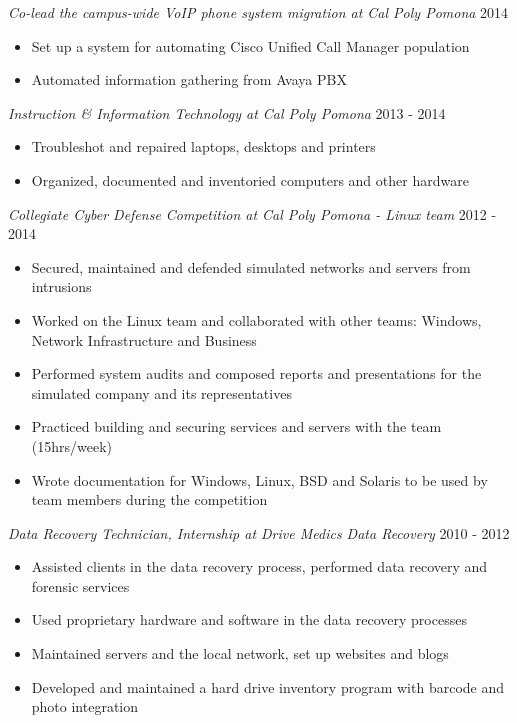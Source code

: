 \documentclass[line]{tex/res}
\begin{document}
\begin{resume}
    {\sl Co-lead the campus-wide VoIP phone system migration at Cal Poly Pomona} \hfill 2014
    \begin{itemize} \itemsep -2pt
        \item Set up a system for automating Cisco Unified Call Manager population
        \item Automated information gathering from Avaya PBX
    \end{itemize}

    {\sl Instruction \& Information Technology at Cal Poly Pomona} \hfill 2013 - 2014
    \begin{itemize} \itemsep -2pt
        \item Troubleshot and repaired laptops, desktops and printers
        \item Organized, documented and inventoried computers and other hardware
    \end{itemize}

    {\sl Collegiate Cyber Defense Competition at Cal Poly Pomona - Linux team} \hfill 2012 - 2014
    \begin{itemize} \itemsep -2pt
        \item Secured, maintained and defended simulated networks and servers from intrusions
        \item Worked on the Linux team and collaborated with other teams: Windows, Network Infrastructure and Business
        \item Performed system audits and composed reports and presentations for the simulated company and its representatives
        \item Practiced building and securing services and servers with the team (15hrs/week)
        \item Wrote documentation for Windows, Linux, BSD and Solaris to be used by team members during the competition
    \end{itemize}

    {\sl Data Recovery Technician, Internship at Drive Medics Data Recovery} \hfill 2010 - 2012
    \begin{itemize} \itemsep -2pt
        \item Assisted clients in the data recovery process, performed data recovery and forensic services
        \item Used proprietary hardware and software in the data recovery processes
        \item Maintained servers and the local network, set up websites and blogs
        \item Developed and maintained a hard drive inventory program with barcode and photo integration
    \end{itemize}


\end{resume}
\end{document}
